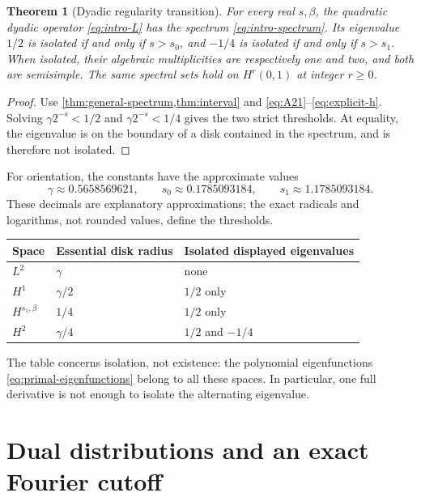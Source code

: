 \documentclass[11pt,a4paper]{article}
\newtheorem{theorem}{Theorem}[section]
\theoremstyle{definition}
\theoremstyle{remark}
\numberwithin{equation}{section}
\begin{document}
\begin{theorem}[Dyadic regularity transition]
\label{thm:dyadic-spectrum}
For every real $s,\beta$, the quadratic dyadic operator \eqref{eq:intro-L}
has the spectrum \eqref{eq:intro-spectrum}. Its eigenvalue $1/2$ is isolated
if and only if $s>s_0$, and $-1/4$ is isolated if and only if $s>s_1$.
When isolated, their algebraic multiplicities are respectively one and two,
and both are semisimple. The same spectral sets hold on $H^r(0,1)$ at
integer $r\ge0$.
\end{theorem}
\begin{proof}
Use \cref{thm:general-spectrum,thm:interval} and
\eqref{eq:A21}--\eqref{eq:explicit-h}. Solving
$\gamma2^{-s}<1/2$ and $\gamma2^{-s}<1/4$ gives the two strict thresholds.
At equality, the eigenvalue is on the boundary of a disk contained in the
spectrum, and is therefore not isolated.
\end{proof}

For orientation, the constants have the approximate values
\begin{equation}
 \gamma\approx0.5658569621,\qquad
 s_0\approx0.1785093184,\qquad s_1\approx1.1785093184.
 \label{eq:threshold-decimals}
\end{equation}
These decimals are explanatory approximations; the exact radicals and
logarithms, not rounded values, define the thresholds.

\begin{center}
\begin{tabular}{lll}
\toprule
Space & Essential disk radius & Isolated displayed eigenvalues\\
\midrule
$L^2$ & $\gamma$ & none\\
$H^1$ & $\gamma/2$ & $1/2$ only\\
$H^{s_1,\beta}$ & $1/4$ & $1/2$ only\\
$H^2$ & $\gamma/4$ & $1/2$ and $-1/4$\\
\bottomrule
\end{tabular}
\end{center}

The table concerns isolation, not existence: the polynomial eigenfunctions
\eqref{eq:primal-eigenfunctions} belong to all these spaces. In particular,
one full derivative is not enough to isolate the alternating eigenvalue.

\section{Dual distributions and an exact Fourier cutoff}
\label{sec:cutoff}
\end{document}
